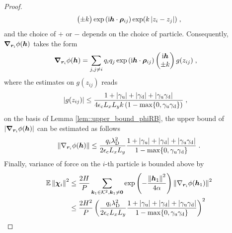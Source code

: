 \begin{proof}
\begin{align*}
\begin{pmatrix}
 \pm k  \end{pmatrix}\exp{(\mathrm{i} \boldsymbol{h} \cdot \boldsymbol{\rho}_{ij})}\exp(k\left\lvert z_i-z_j\right\rvert)\;,\\
\end{align*}
and  the choice of $+$ or $-$ depends on the choice of particle. Consequently, $\boldsymbol{\nabla}_{\boldsymbol{r}_i} \phi(\boldsymbol{h})$ takes the form
\begin{align*}
  \boldsymbol{\nabla}_{\boldsymbol{r}_i} \phi(\boldsymbol{h})  &=\sum_{j,j\neq i}q_iq_j  \exp{(\mathrm{i} \boldsymbol{h} \cdot \boldsymbol{\rho}_{ij})} \begin{pmatrix} \mathrm{i} \boldsymbol{h} \\
 \pm k  \end{pmatrix}g(z_{ij})\;,
\end{align*}
where the estimates on $g(z_{ij})$ reads
\begin{align*}
  \left\lvert g(z_{ij})  \right\rvert&\leq  \frac{1+\left\lvert\gamma_{\mathrm{u}}\right\rvert+\left\lvert\gamma_{\mathrm{d}}\right\rvert+\left\lvert\gamma_{\mathrm{u}}\gamma_{\mathrm{d}}\right\rvert}{4\epsilon_{\mathrm{c}} L_xL_y k\left(1-\max\{0,\gamma_{\mathrm{u}}\gamma_{\mathrm{d}}\}\right)}\;,
\end{align*}
on the basis of Lemma \ref{lem::upper_bound_phiRB}, the upper bound of~$\lvert\boldsymbol{\nabla}_{\boldsymbol{r}_i} \phi(\boldsymbol{h})\rvert$ can be estimated as follows 
\begin{equation}
  \left\lVert\nabla_{\bm{r}_i}\phi(\boldsymbol{h})\right\rVert\leq \frac{q_i\lambda_{\mathrm{D}}^2}{2\epsilon_{\mathrm{c}} L_xL_y}    \frac{1+\left\lvert\gamma_{\mathrm{u}}\right\rvert+\left\lvert\gamma_{\mathrm{d}}\right\rvert+\left\lvert\gamma_{\mathrm{u}}\gamma_{\mathrm{d}}\right\rvert}{1-\max\{0,\gamma_{\mathrm{u}}\gamma_{\mathrm{d}}\}}\;.
\end{equation}
Finally,  variance of force on the $i$-th particle is bounded above by
\begin{align*}
   	\mathbb{E}\Norm{\V{\chi}_{i}}^2&\leq   \frac{2H}{P}\sum_{\bm{k}_1\in\fK^2, \bm{k}_1\neq \vzero}\exp\left(-\frac{\Norm{\V{h}_1}^2}{4\alpha}\right)\Norm{\nabla_{\bm{r}_i}\phi(\V{h}_1)}^2\\
    &\leq  \frac{2H^2}{P}\left(\frac{q_i\lambda_{\mrm{D}}^2}{2\epsilon_{\mrm{c}} L_xL_y}    \frac{1+\Abs{\gamma_{\mrm{u}}}+\Abs{\gamma_{\mrm{d}}}+\Abs{\gamma_{\mrm{u}}\gamma_{\mrm{d}}}}{1-\max\{0,\gamma_{\mrm{u}}\gamma_{\mrm{d}}\}}\right)^2\\

\end{align*}
\end{proof}
